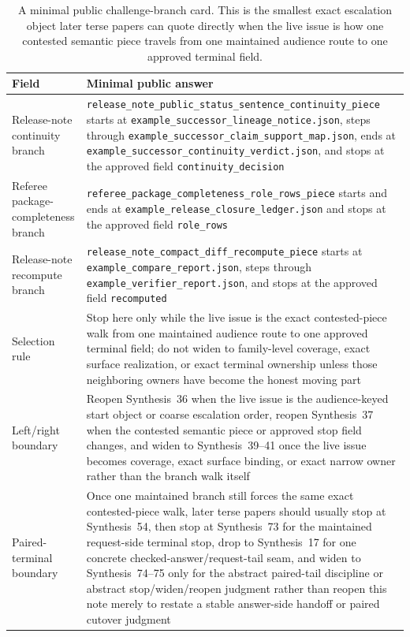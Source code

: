 \documentclass[11pt]{article}
\begin{document}
\begin{table}[t]
\centering
\small
\begin{tabularx}{\linewidth}{@{}lX@{}}
\toprule
Field & Minimal public answer \\
\midrule
Release-note continuity branch & \nolinkurl{release_note_public_status_sentence_continuity_piece} starts at \nolinkurl{example_successor_lineage_notice.json}, steps through \nolinkurl{example_successor_claim_support_map.json}, ends at \nolinkurl{example_successor_continuity_verdict.json}, and stops at the approved field \nolinkurl{continuity_decision} \\
Referee package-completeness branch & \nolinkurl{referee_package_completeness_role_rows_piece} starts and ends at \nolinkurl{example_release_closure_ledger.json} and stops at the approved field \nolinkurl{role_rows} \\
Release-note recompute branch & \nolinkurl{release_note_compact_diff_recompute_piece} starts at \nolinkurl{example_compare_report.json}, steps through \nolinkurl{example_verifier_report.json}, and stops at the approved field \nolinkurl{recomputed} \\
Selection rule & Stop here only while the live issue is the exact contested-piece walk from one maintained audience route to one approved terminal field; do not widen to family-level coverage, exact surface realization, or exact terminal ownership unless those neighboring owners have become the honest moving part \\
Left/right boundary & Reopen Synthesis~36 when the live issue is the audience-keyed start object or coarse escalation order, reopen Synthesis~37 when the contested semantic piece or approved stop field changes, and widen to Synthesis~39--41 once the live issue becomes coverage, exact surface binding, or exact narrow owner rather than the branch walk itself \\
Paired-terminal boundary & Once one maintained branch still forces the same exact contested-piece walk, later terse papers should usually stop at Synthesis~54, then stop at Synthesis~73 for the maintained request-side terminal stop, drop to Synthesis~17 for one concrete checked-answer/request-tail seam, and widen to Synthesis~74--75 only for the abstract paired-tail discipline or abstract stop/widen/reopen judgment rather than reopen this note merely to restate a stable answer-side handoff or paired cutover judgment \\
\bottomrule
\end{tabularx}
\caption{A minimal public challenge-branch card. This is the smallest exact escalation object later terse papers can quote directly when the live issue is how one contested semantic piece travels from one maintained audience route to one approved terminal field.}
\label{tab:minimal-public-challenge-branch-card}
\end{table}
\end{document}
